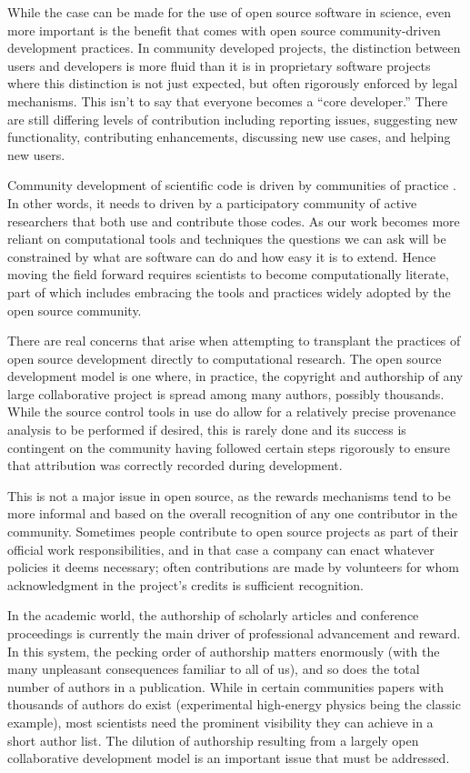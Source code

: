 \documentclass[ChapterTOCs,krantz2]{krantz} %
\begin{document}
While the case can be made for the use of open source software in science, even
more important is the benefit that comes with open source community-driven
development practices.  In community developed projects, the distinction
between users and developers is more fluid than it is in proprietary software
projects where this distinction is not just expected, but often rigorously
enforced by legal mechanisms. This isn't to say that everyone becomes a ``core
developer.'' There are still differing levels of contribution including
reporting issues, suggesting new functionality, contributing enhancements,
discussing new use cases, and helping new users.

Community development of scientific code is driven by communities of practice
\cite{turk2013scale}. In other words, it needs to driven by a participatory
community of active researchers that both use and contribute those codes. As
our work becomes more reliant on computational tools and techniques the
questions we can ask will be constrained by what are software can do and how
easy it is to extend. Hence moving the field forward requires scientists to
become computationally literate, part of which includes embracing the tools and
practices widely adopted by the open source community.

There are real concerns that arise when attempting to transplant the practices of
open source development directly to computational research. The open source development
model is one where, in practice, the copyright and authorship of any
large collaborative project is spread among many authors, possibly thousands.
While the source control tools in use do allow for a relatively precise
provenance analysis to be performed if desired, this is rarely done and its
success is contingent on the community having followed certain steps rigorously
to ensure that attribution was correctly recorded during development.

This is not a major issue in open source, as the rewards mechanisms tend to be
more informal and based on the overall recognition of any one contributor in
the community. Sometimes people contribute to open source projects as part of
their official work responsibilities, and in that case a company can enact
whatever policies it deems necessary; often contributions are made by
volunteers for whom acknowledgment in the project's credits is sufficient
recognition.

In the academic world, the authorship of scholarly articles and conference
proceedings is currently the main driver of professional advancement and
reward. In this system, the pecking order of authorship matters enormously
(with the many unpleasant consequences familiar to all of us), and so does the
total number of authors in a publication. While in certain communities papers
with thousands of authors do exist (experimental high-energy physics being the
classic example), most scientists need the prominent visibility they can
achieve in a short author list. The dilution of authorship resulting from a
largely open collaborative development model is an important issue that must be
addressed.
\end{document}
